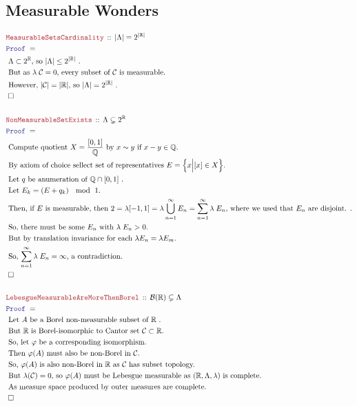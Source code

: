 \documentclass[12pt]{scrartcl}
\newcommand{\LOGIC}[1]{\textcolor{Blue}{\mathtt{#1}}}
\newcommand{\THM}[1]{\textcolor{Maroon}{\mathtt{#1}}}
\renewcommand{\.}{\; . \;}
\newcommand{\Theorem}[2]{& \THM{#1} \, :: \, #2 \\ & \Proof = \\ }
\newcommand{\Page}[1]{ \begin{align*} #1 \end{align*}   }
\newcommand{\Reals}{\mathbb{R} }
\newcommand{\Rats}{\mathbb{Q} }
\newcommand{\QED}{\; \square}
\newcommand{\EndProof}{& \QED \\}
\newcommand{\Proof}{\LOGIC{Proof} \; }
\newcommand{\Explain}[1]{& \text{#1.} \\}
\newcommand{\Borel}{\mathcal{B}}
\newcommand{\Cantor}{\mathcal{C}}
\begin{document}
\subsection{Measurable Wonders}
\Page{
	\Theorem{MeasurableSetsCardinality}
	{
		|\Lambda| = 2^{|\Reals|}
	}
	\Explain{ $\Lambda \subset 2^\Reals$, so $|\Lambda| \le 2^{|\Reals|}$  }
	\Explain{ But as $\lambda \; \Cantor = 0$, every subset of $\Cantor$ is measurable}
	\Explain{ However, $|\Cantor| = |\Reals|$, so $|\Lambda| = 2^{|\Reals|}$ }
	\EndProof
	\\	
	\Theorem{NonMeasurableSetExists}
	{
		\Lambda \subsetneq 2^\Reals
	}
	\Explain{ Compute quotient $X = \frac{[0,1]}{\Rats}$ by $x \sim y$ if $x-y \in \Rats$}
	\Explain{ By axiom of choice sellect set of representatives 
		$E = \Big\{ x \Big| [x] \in X \Big\}$}
	\Explain{ Let $q$ be anumeration of $\Rats \cap [0,1]$  }
	\Explain{ Let $E_k =  (E + q_k) \; \mod \; 1$}
	\Explain{ Then, if $E$ is measurable, then 
		$2 = \lambda [-1,1] = \lambda \bigcup^\infty_{n=1} E_n = \sum^\infty_{n=1} \lambda \; E_n$,
		where we used that $E_n$ are disjoint.	
	}
	\Explain{ So, there must be some $E_n$ with $\lambda \; E_n > 0$} 
	\Explain{ But by translation invariance for each $\lambda E_n = \lambda E_m$}
	\Explain{ So,   $\sum^\infty_{n=1} \lambda \; E_n = \infty$, a contradiction}
	\EndProof	
	\\
	\Theorem{LebesgueMeasurableAreMoreThenBorel}
	{
		\Borel(\Reals) \subsetneq \Lambda
	}
	\Explain{ Let $A$ be a Borel non-measurable subset of $\Reals$ }
	\Explain{ But $\Reals$ is Borel-isomorphic to Cantor set $\Cantor \subset \Reals$}
	\Explain{ So, let $\varphi$ be a corresponding isomorphism}
	\Explain{ Then $\varphi(A)$ must also be non-Borel in $\Cantor$}
	\Explain{ So, $\varphi(A)$ is also non-Borel in $\Reals$ as $\Cantor$ has subset topology}
	\Explain{ But $\lambda(\Cantor) =0$, so $\varphi(A)$ must be Lebesgue measurable
		as $(\Reals,\Lambda,\lambda)$ is complete} 
	\Explain{ As measure space produced by outer measures are complete}
	\EndProof
}
\end{document}
